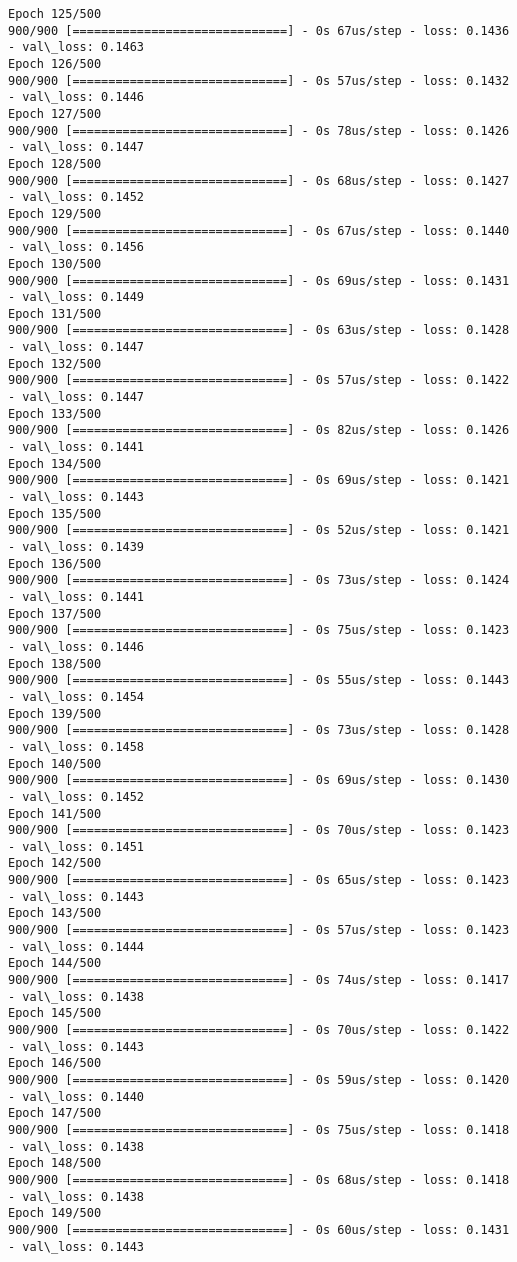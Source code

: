 \documentclass[11pt]{article}
\begin{document}
\begin{Verbatim}[commandchars=\\\{\}]
Epoch 125/500
900/900 [==============================] - 0s 67us/step - loss: 0.1436 - val\_loss: 0.1463
Epoch 126/500
900/900 [==============================] - 0s 57us/step - loss: 0.1432 - val\_loss: 0.1446
Epoch 127/500
900/900 [==============================] - 0s 78us/step - loss: 0.1426 - val\_loss: 0.1447
Epoch 128/500
900/900 [==============================] - 0s 68us/step - loss: 0.1427 - val\_loss: 0.1452
Epoch 129/500
900/900 [==============================] - 0s 67us/step - loss: 0.1440 - val\_loss: 0.1456
Epoch 130/500
900/900 [==============================] - 0s 69us/step - loss: 0.1431 - val\_loss: 0.1449
Epoch 131/500
900/900 [==============================] - 0s 63us/step - loss: 0.1428 - val\_loss: 0.1447
Epoch 132/500
900/900 [==============================] - 0s 57us/step - loss: 0.1422 - val\_loss: 0.1447
Epoch 133/500
900/900 [==============================] - 0s 82us/step - loss: 0.1426 - val\_loss: 0.1441
Epoch 134/500
900/900 [==============================] - 0s 69us/step - loss: 0.1421 - val\_loss: 0.1443
Epoch 135/500
900/900 [==============================] - 0s 52us/step - loss: 0.1421 - val\_loss: 0.1439
Epoch 136/500
900/900 [==============================] - 0s 73us/step - loss: 0.1424 - val\_loss: 0.1441
Epoch 137/500
900/900 [==============================] - 0s 75us/step - loss: 0.1423 - val\_loss: 0.1446
Epoch 138/500
900/900 [==============================] - 0s 55us/step - loss: 0.1443 - val\_loss: 0.1454
Epoch 139/500
900/900 [==============================] - 0s 73us/step - loss: 0.1428 - val\_loss: 0.1458
Epoch 140/500
900/900 [==============================] - 0s 69us/step - loss: 0.1430 - val\_loss: 0.1452
Epoch 141/500
900/900 [==============================] - 0s 70us/step - loss: 0.1423 - val\_loss: 0.1451
Epoch 142/500
900/900 [==============================] - 0s 65us/step - loss: 0.1423 - val\_loss: 0.1443
Epoch 143/500
900/900 [==============================] - 0s 57us/step - loss: 0.1423 - val\_loss: 0.1444
Epoch 144/500
900/900 [==============================] - 0s 74us/step - loss: 0.1417 - val\_loss: 0.1438
Epoch 145/500
900/900 [==============================] - 0s 70us/step - loss: 0.1422 - val\_loss: 0.1443
Epoch 146/500
900/900 [==============================] - 0s 59us/step - loss: 0.1420 - val\_loss: 0.1440
Epoch 147/500
900/900 [==============================] - 0s 75us/step - loss: 0.1418 - val\_loss: 0.1438
Epoch 148/500
900/900 [==============================] - 0s 68us/step - loss: 0.1418 - val\_loss: 0.1438
Epoch 149/500
900/900 [==============================] - 0s 60us/step - loss: 0.1431 - val\_loss: 0.1443

\end{Verbatim}
\end{document}
